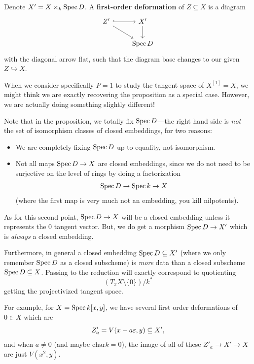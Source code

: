 \documentclass[12pt]{article}
\begin{document}
\begin{defn}
    Denote $X'=X\times_k \operatorname{Spec} D$. A \textbf{first-order deformation} of $Z \subseteq X$ is a diagram
    \[\begin{tikzcd}
        Z' \rar[hook] \ar[dr] & X' \dar\\
         & \Spec D
    \end{tikzcd}\]
    with the diagonal arrow flat, such that the diagram base changes to our given $Z\hookrightarrow X$.
\end{defn}


\begin{rmk}
    When we consider specifically $P=1$ to study the tangent space of $X^{[1]}=X$, we might think we are exactly recovering the proposition as a special case. However, we are actually doing something slightly different!

    Note that in the proposition, we totally fix $\operatorname{Spec} D$---the right hand side is \textit{not} the set of isomorphism classes of closed embeddings, for two reasons:
    \begin{itemize}
        \item We are completely fixing $\operatorname{Spec} D$ up to equality, not isomorphism.
        \item Not all maps $\operatorname{Spec} D\to X$ are closed embeddings, since we do not need to be surjective on the level of rings by doing a factorization
        \[\operatorname{Spec} D \to \operatorname{Spec} k \to X\]
        (where the first map is very much not an embedding, you kill nilpotents).
    \end{itemize}
    
    As for this second point, $\operatorname{Spec} D \to X$ will be a closed embedding unless it represents the 0 tangent vector. But, we do get a morphism $\operatorname{Spec} D \to X'$ which is \textit{always} a closed embedding.

    Furthermore, in general a closed embedding $\operatorname{Spec} D\subseteq X'$ (where we only remember $\operatorname{Spec} D$ as a closed subscheme) is \textit{more} data than a closed subscheme $\operatorname{Spec} D\subseteq X$. Passing to the reduction will exactly correspond to quotienting
    \[(T_x X \setminus \{0\}) / k^*\]
    getting the projectivized tangent space.

    For example, for $X=\operatorname{Spec} k[x,y]$, we have several first order deformations of $0\in X$ which are
    \[Z'_a = V(x-a\varepsilon, y) \subseteq X',\]
    and when $a\neq 0$ (and maybe $\mathrm{char} k=0$), the image of all of these $Z'_a \to X' \to X$ are just $V(x^2,y)$.
\end{rmk}
\end{document}
